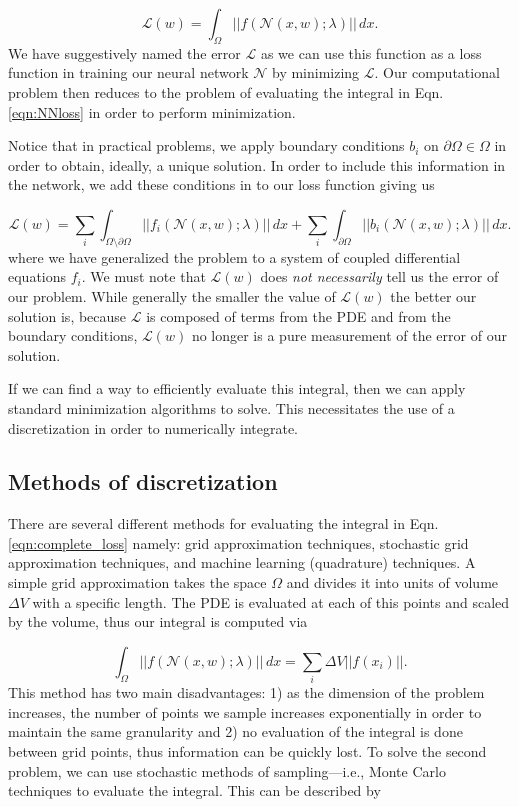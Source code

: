 \documentclass{CUP-JNL-DTM}%
\theoremstyle{definition}
\numberwithin{equation}{section}
\newcommand{\loss}{\mathcal{L}}
\newcommand{\net}{\mathcal{N}}
\begin{document}
\begin{equation}
	\loss(w) = \int_{\Omega} ||f(\net(x,w); \lambda)||\,dx. 
	\label{eqn:NNloss}
\end{equation}
We have suggestively named the error $\loss$ as we can use this function as a loss function in training our neural network $\net$ by minimizing $\loss$. Our computational problem then reduces to the problem of evaluating the integral in Eqn. \ref{eqn:NNloss} in order to perform minimization. 

Notice that in practical problems, we apply boundary conditions $b_i$ on $\partial \Omega \in \Omega$ in order to obtain, ideally, a unique solution. In order to include this information in the network, we add these conditions in to our loss function giving us 

\begin{equation}
	\loss(w) = \sum_i\int_{\Omega\setminus\partial\Omega} ||f_i(\net(x,w); \lambda)||\,dx + \sum_i\int_{\partial\Omega} ||b_i(\net(x,w); \lambda)||\,dx.
	\label{eqn:complete_loss} 
\end{equation}
where we have generalized the problem to a system of coupled differential equations $f_i$. We must note that $\loss(w)$ does \emph{not necessarily} tell us the error of our problem. While generally the smaller the value of $\loss(w)$ the better our solution is, because $\loss$ is composed of terms from the PDE and from the boundary conditions, $\loss(w)$ no longer is a pure measurement of the error of our solution. 

If we can find a way to efficiently evaluate this integral, then we can apply standard minimization algorithms to solve. This necessitates the use of a discretization in order to numerically integrate. 

\subsection{Methods of discretization}

There are several different methods for evaluating the integral in Eqn. \ref{eqn:complete_loss} namely: grid approximation techniques, stochastic grid approximation techniques, and machine learning (quadrature) techniques. A simple grid approximation takes the space $\Omega$ and divides it into units of volume $\Delta V$ with a specific length. The PDE is evaluated at each of this points and scaled by the volume, thus our integral is computed via 

\begin{equation}
	\int_{\Omega} ||f(\net(x,w); \lambda)||\,dx = \sum_i \Delta V ||f(x_i)||.
\end{equation}
This method has two main disadvantages: 1) as the dimension of the problem increases, the number of points we sample increases exponentially in order to maintain the same granularity and 2) no evaluation of the integral is done between grid points, thus information can be quickly lost. To solve the second problem, we can use stochastic methods of sampling---i.e., Monte Carlo techniques to evaluate the integral. This can be described by 
\end{document}
